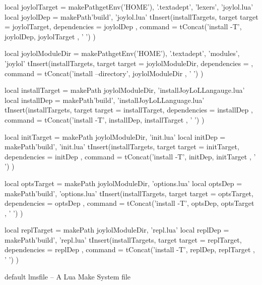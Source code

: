 \startLmsfile
local joylolTarget =
  makePath{getEnv('HOME'), '.textadept', 'lexers', 'joylol.lua'}
local joylolDep    = makePath{'build', 'joylol.lua'}
tInsert(installTargets, target{
  target       = joylolTarget,
  dependencies = { joylolDep },
  command      = tConcat({'install -T', joylolDep, joylolTarget }, ' ')
})

local joylolModuleDir =
  makePath{getEnv('HOME'), '.textadept', 'modules', 'joylol'}
tInsert(installTargets, target{
  target       = joylolModuleDir,
  dependencies = { },
  command      = tConcat({'install --directory', joylolModuleDir }, ' ')
})

local installTarget =
  makePath{ joylolModuleDir, 'installJoyLoLLangauge.lua'}
local installDep    = makePath{'build', 'installJoyLoLLanguage.lua'}
tInsert(installTargets, target{
  target       = installTarget,
  dependencies = { installDep },
  command      = tConcat({'install -T', installDep, installTarget }, ' ')
})

local initTarget =
  makePath{ joylolModuleDir, 'init.lua'}
local initDep    = makePath{'build', 'init.lua'}
tInsert(installTargets, target{
  target       = initTarget,
  dependencies = { initDep },
  command      = tConcat({'install -T', initDep, initTarget }, ' ')
})

local optsTarget =
  makePath{ joylolModuleDir, 'options.lua'}
local optsDep    = makePath{'build', 'options.lua'}
tInsert(installTargets, target{
  target       = optsTarget,
  dependencies = { optsDep },
  command      = tConcat({'install -T', optsDep, optsTarget }, ' ')
})

local replTarget =
  makePath{ joylolModuleDir, 'repl.lua'}
local replDep    = makePath{'build', 'repl.lua'}
tInsert(installTargets, target{
  target       = replTarget,
  dependencies = { replDep },
  command      = tConcat({'install -T', replDep, replTarget }, ' ')
})
\stopLmsfile



\createLmsfileFile%
  {default}%
  {lmsfile}%
  {-- A Lua Make System file}
